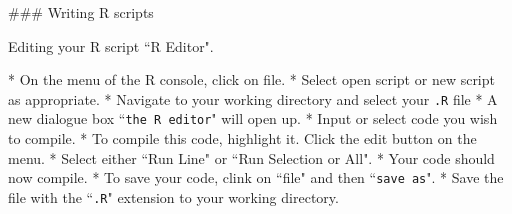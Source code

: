 ### Writing R scripts

Editing your R script ``R Editor".

* On the menu of the R console, click on file.
* Select open script or new script as appropriate.
* Navigate to your working directory and select your \texttt{.R} file
* A new dialogue box ``\texttt{the R editor}" will open up.
* Input or select code you wish to compile.
* To compile this code, highlight it. Click the edit button on the menu.
* Select either ``Run Line" or ``Run Selection or All".
* Your code should now compile.
* To save your code, clink on ``file" and then ``\texttt{save as}".
* Save the file with the ``\texttt{.R}" extension to your working directory.


